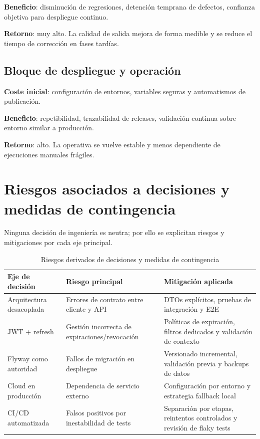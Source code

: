 \textbf{Beneficio}:
disminuci\'on de regresiones,
detenci\'on temprana de defectos,
confianza objetiva para despliegue continuo.

\textbf{Retorno}:
muy alto. La calidad de salida mejora de forma medible
y se reduce el tiempo de correcci\'on en fases tard\'ias.

\subsection{Bloque de despliegue y operaci\'on}

\textbf{Coste inicial}:
configuraci\'on de entornos,
variables seguras y automatismos de publicaci\'on.

\textbf{Beneficio}:
repetibilidad,
trazabilidad de releases,
validaci\'on continua sobre entorno similar a producci\'on.

\textbf{Retorno}:
alto. La operativa se vuelve estable y menos dependiente
de ejecuciones manuales fr\'agiles.

\FloatBarrier
\section{Riesgos asociados a decisiones y medidas de contingencia}

Ninguna decisi\'on de ingenier\'ia es neutra;
por ello se explicitan riesgos y mitigaciones por cada eje principal.

\begin{table}[!htbp]
\centering
\begin{tabular}{|P{3.4cm}|P{4.3cm}|P{4.5cm}|}
\hline
\textbf{Eje de decisi\'on} & \textbf{Riesgo principal} & \textbf{Mitigaci\'on aplicada} \\
\hline
Arquitectura desacoplada & Errores de contrato entre cliente y API & DTOs expl\'icitos, pruebas de integraci\'on y E2E \\
\hline
JWT + refresh & Gesti\'on incorrecta de expiraciones/revocaci\'on & Pol\'iticas de expiraci\'on, filtros dedicados y validaci\'on de contexto \\
\hline
Flyway como autoridad & Fallos de migraci\'on en despliegue & Versionado incremental, validaci\'on previa y backups de datos \\
\hline
Cloud en producci\'on & Dependencia de servicio externo & Configuraci\'on por entorno y estrategia fallback local \\
\hline
CI/CD automatizada & Falsos positivos por inestabilidad de tests & Separaci\'on por etapas, reintentos controlados y revisi\'on de flaky tests \\
\hline
\end{tabular}
\caption{Riesgos derivados de decisiones y medidas de contingencia}
\label{tab:riesgos-decisiones}
\end{table}

